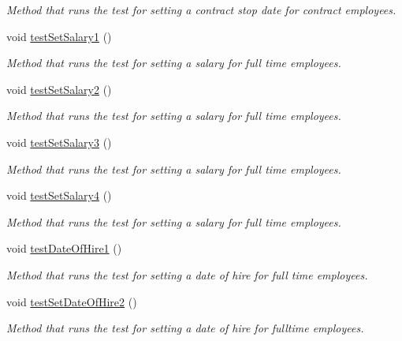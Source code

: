 \begin{DoxyCompactItemize}
\begin{DoxyCompactList}\small\item\em Method that runs the test for setting a contract stop date for contract employees. \end{DoxyCompactList}\item 
void \hyperlink{class_all_employees_test_1_1_all_employees_tests_a4ff0cc818257c96ed82c5dc6dc1eea09}{test\+Set\+Salary1} ()
\begin{DoxyCompactList}\small\item\em Method that runs the test for setting a salary for full time employees. \end{DoxyCompactList}\item 
void \hyperlink{class_all_employees_test_1_1_all_employees_tests_a2bef85049e636f9cdf210a130936a023}{test\+Set\+Salary2} ()
\begin{DoxyCompactList}\small\item\em Method that runs the test for setting a salary for full time employees. \end{DoxyCompactList}\item 
void \hyperlink{class_all_employees_test_1_1_all_employees_tests_a21c7fd6188c0c0eee40064d6af335f4c}{test\+Set\+Salary3} ()
\begin{DoxyCompactList}\small\item\em Method that runs the test for setting a salary for full time employees. \end{DoxyCompactList}\item 
void \hyperlink{class_all_employees_test_1_1_all_employees_tests_a290186ab6c5b51649fb5a877bb752563}{test\+Set\+Salary4} ()
\begin{DoxyCompactList}\small\item\em Method that runs the test for setting a salary for full time employees. \end{DoxyCompactList}\item 
void \hyperlink{class_all_employees_test_1_1_all_employees_tests_a6e50e22ee565d9d760c5070ecb1f587e}{test\+Date\+Of\+Hire1} ()
\begin{DoxyCompactList}\small\item\em Method that runs the test for setting a date of hire for full time employees. \end{DoxyCompactList}\item 
void \hyperlink{class_all_employees_test_1_1_all_employees_tests_a8af492936e2e5b3ca070524563814967}{test\+Set\+Date\+Of\+Hire2} ()
\begin{DoxyCompactList}\small\item\em Method that runs the test for setting a date of hire for fulltime employees. \end{DoxyCompactList}\item 

\end{DoxyCompactItemize}

